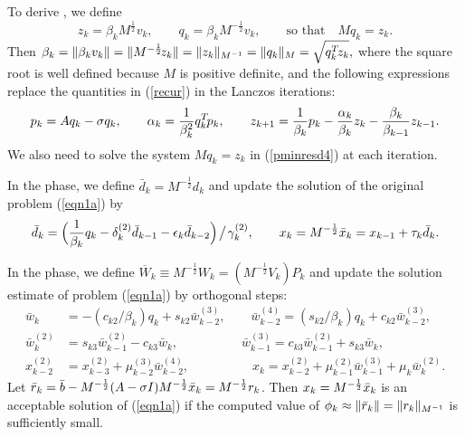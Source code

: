 \documentclass{doc_acmtrans2m}
\newcommand{\myhalf}{\frac12}
\begin{document}
To derive \MINRESQLP, we define
\begin{equation}  \label{pminresd4}
   z_k = \beta_k M^{ \myhalf} v_k, \qquad
   q_k = \beta_k M^{-\myhalf} v_k,
   \qquad \text{so that} \quad M q_k =z_k.
\end{equation}
Then \( \beta_k = \norm{\beta_k v_k} = \norm{M^{-\myhalf} \! z_k} =
\norm{ z_k} _{M^{-1}} = \norm{ q_k }_M = \sqrt{ q_k\T z_k }, \) where
the square root is well defined because $M$ is positive definite, and
the following expressions replace the quantities in (\ref{recur}) in
the Lanczos iterations:
\begin{equation}
\label{precon-lanzos}
        p_k = A q_k - \sigma q_k, \qquad \alpha_k =
        \frac{1}{\beta_k^2} q_k\T p_k, \qquad z_{k+1} =
        \frac{1}{\beta_k} p_k - \frac{\alpha_k}{\beta_k} z_k -
        \frac{\beta_k}{\beta_{k-1}} z_{k-1}.
\end{equation}
We also need to solve the system $M q_k = z_k$ in (\ref{pminresd4}) at
each iteration.

In the \MINRES phase, we define $\bar{d}_k = M^{-\myhalf}d_k$ and
update the solution of the original problem (\ref{eqn1a}) by
\[
  \bar{d}_k = \Bigl( \frac{1}{\beta_k} q_k
                - \delta_k^{(2)} \bar{d}_{k-1}
                - \epsilon_k \bar{d}_{k-2} \Bigr)
                 \!\bigm/\! \gamma_k^{(2)},
  \qquad
  x_k = M^{-\myhalf} \xbar_k
      = x_{k-1} + \tau_k \bar{d}_k.     
\]

In the \MINRESQLP phase, we define $\overline{W}_k \equiv M^{-\myhalf}
W_k = (M^{-\myhalf} V_k) P_k $ and update the solution estimate of
problem (\ref{eqn1a}) by orthogonal steps:
\begin{align*}
   \bar{w}_k &= -(c_{k2} / \beta_k) q_k + s_{k2} \bar{w}_{k-2}^{(3)},
   \qquad \bar{w}_{k-2}^{(4)} = (s_{k2} / \beta_k) q_k
                               + c_{k2} \bar{w}_{k-2}^{(3)},
\\   \bar{w}_k^{(2)} &= s_{k3} \bar{w}_{k-1}^{(2)} - c_{k3} \bar{w}_k,
   \qquad \quad \quad \quad \bar{w}_{k-1}^{(3)}
                      = c_{k3} \bar{w}_{k-1}^{(2)} + s_{k3} \bar{w}_k,
\\  x_{k-2}^{(2)} &= x_{k-3}^{(2)} + \mu_{k-2}^{(3)} \bar{w}_{k-2}^{(4)},
   \qquad \qquad \quad  x_k = x_{k-2}^{(2)}
                            + \mu_{k-1}^{(2)} \bar{w}_{k-1}^{(3)}
                            + \mu_k \bar{w}_k^{(2)}.
\end{align*}
Let $\rbar_k = \bar{b} - M^{-\myhalf}(A - \sigma I) M^{-\myhalf} \xbar_k =
M^{-\myhalf} r_k$.  Then $x_k = M^{-\myhalf} \xbar_k$ is an acceptable
solution of (\ref{eqn1a}) if the computed value of $\phi_k \approx
\norm{\rbar_k} = \norm{r_k}_{M^{-1}}$ is sufficiently small.
\end{document}
